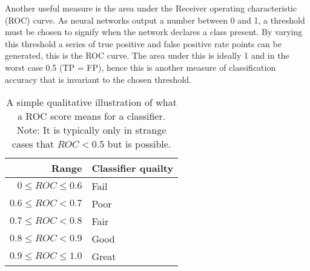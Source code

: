     Another useful measure is the area under the Receiver operating characteristic (ROC) curve.
    As neural networks output a number between 0 and 1, a threshold must be chosen to signify
    when the network declares a class present. By varying this threshold a series of true positive and false positive rate points
    can be generated, this is the ROC curve. The area under this is ideally 1 and in the worst case 0.5 (TP = FP), hence this is
    another measure of classification accuracy that is invariant to the chosen threshold.

    \begin{table}[]
      \centering \caption{A simple qualitative illustration of what a ROC score means for a classifier.
      Note: It is typically only in strange cases that $ROC< 0.5$ but is possible.} \label{my-label}
      \begin{tabular}{rl}
        \hline
        Range & Classifier quailty \\ \hline
        $0 \leq ROC \leq 0.6$   & Fail               \\
        $0.6 \leq ROC    < 0.7$   & Poor               \\
        $0.7 \leq ROC    < 0.8$   & Fair               \\
        $0.8 \leq ROC    < 0.9$   & Good               \\
        $0.9 \leq ROC \leq 1.0$   & Great              \\ \hline
      \end{tabular}
    \end{table}



